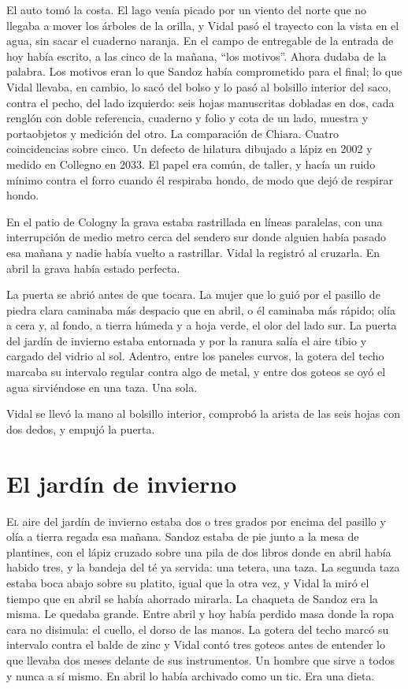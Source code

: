 El auto tomó la costa. El lago venía picado por un viento del norte que no llegaba a mover los árboles de la orilla, y Vidal pasó el trayecto con la vista en el agua, sin sacar el cuaderno naranja. En el campo de entregable de la entrada de hoy había escrito, a las cinco de la mañana, ``los motivos''. Ahora dudaba de la palabra. Los motivos eran lo que Sandoz había comprometido para el final; lo que Vidal llevaba, en cambio, lo sacó del bolso y lo pasó al bolsillo interior del saco, contra el pecho, del lado izquierdo: seis hojas manuscritas dobladas en dos, cada renglón con doble referencia, cuaderno y folio y cota de un lado, muestra y portaobjetos y medición del otro. La comparación de Chiara. Cuatro coincidencias sobre cinco. Un defecto de hilatura dibujado a lápiz en 2002 y medido en Collegno en 2033. El papel era común, de taller, y hacía un ruido mínimo contra el forro cuando él respiraba hondo, de modo que dejó de respirar hondo.

En el patio de Cologny la grava estaba rastrillada en líneas paralelas, con una interrupción de medio metro cerca del sendero sur donde alguien había pasado esa mañana y nadie había vuelto a rastrillar. Vidal la registró al cruzarla. En abril la grava había estado perfecta.

La puerta se abrió antes de que tocara. La mujer que lo guió por el pasillo de piedra clara caminaba más despacio que en abril, o él caminaba más rápido; olía a cera y, al fondo, a tierra húmeda y a hoja verde, el olor del lado sur. La puerta del jardín de invierno estaba entornada y por la ranura salía el aire tibio y cargado del vidrio al sol. Adentro, entre los paneles curvos, la gotera del techo marcaba su intervalo regular contra algo de metal, y entre dos goteos se oyó el agua sirviéndose en una taza. Una sola.

Vidal se llevó la mano al bolsillo interior, comprobó la arista de las seis hojas con dos dedos, y empujó la puerta.

\clearpage

\chapter{El jardín de invierno}

\lettrine[lines=2, lhang=0.1, nindent=0.2em]{E}{l} aire del jardín de invierno estaba dos o tres grados por encima del pasillo y olía a tierra regada esa mañana. Sandoz estaba de pie junto a la mesa de plantines, con el lápiz cruzado sobre una pila de dos libros donde en abril había habido tres, y la bandeja del té ya servida: una tetera, una taza. La segunda taza estaba boca abajo sobre su platito, igual que la otra vez, y Vidal la miró el tiempo que en abril se había ahorrado mirarla. La chaqueta de Sandoz era la misma. Le quedaba grande. Entre abril y hoy había perdido masa donde la ropa cara no disimula: el cuello, el dorso de las manos. La gotera del techo marcó su intervalo contra el balde de zinc y Vidal contó tres goteos antes de entender lo que llevaba dos meses delante de sus instrumentos. Un hombre que sirve a todos y nunca a sí mismo. En abril lo había archivado como un tic. Era una dieta.


